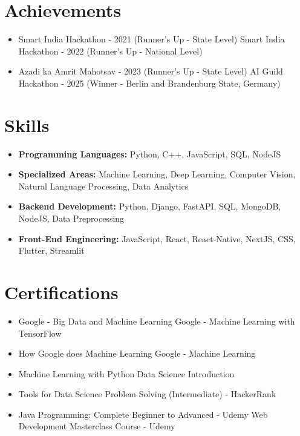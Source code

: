 \documentclass[a4paper,10pt]{article}
\begin{document}
\section*{Achievements}
\begin{itemize}
\item Smart India Hackathon - 2021 (Runner's Up - State Level) \hfill Smart India Hackathon - 2022 (Runner's Up - National Level)
\item Azadi ka Amrit Mahotsav - 2023 (Runner's Up - State Level) \hfill AI Guild Hackathon - 2025 (Winner - Berlin and Brandenburg State, Germany)
\end{itemize}

\section*{Skills}
\begin{itemize}
  \item \textbf{Programming Languages:} Python, C++, JavaScript, SQL, NodeJS
  \item \textbf{Specialized Areas:} Machine Learning, Deep Learning, Computer Vision, Natural Language Processing, Data Analytics
  \item \textbf{Backend Development:} Python, Django, FastAPI, SQL, MongoDB, NodeJS, Data Preprocessing
  \item \textbf{Front-End Engineering:} JavaScript, React, React-Native, NextJS, CSS, Flutter, Streamlit
\end{itemize}

\section*{Certifications}
\begin{itemize}
\item Google - Big Data and Machine Learning \hfill Google - Machine Learning with TensorFlow
\item How Google does Machine Learning \hfill Google - Machine Learning
\item Machine Learning with Python \hfill Data Science Introduction
\item Tools for Data Science \hfill Problem Solving (Intermediate) - HackerRank
\item Java Programming: Complete Beginner to Advanced - Udemy \hfill Web Development Masterclass Course - Udemy
\end{itemize}
\end{document}
